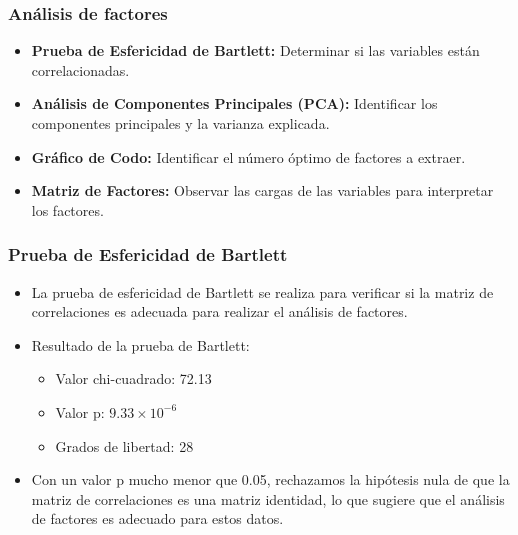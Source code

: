 \documentclass[
	11pt, %
]{beamer}
\begin{document}

\begin{frame}
  \frametitle{Análisis de factores}

    \begin{itemize}
    \item \textbf{Prueba de Esfericidad de Bartlett:} Determinar si las variables están correlacionadas.
    \item \textbf{Análisis de Componentes Principales (PCA):} Identificar los componentes principales y la varianza explicada.
    \item \textbf{Gráfico de Codo:} Identificar el número óptimo de factores a extraer.
    \item \textbf{Matriz de Factores:} Observar las cargas de las variables para interpretar los factores.
  \end{itemize}
 
\end{frame}


\begin{frame}
\frametitle{Prueba de Esfericidad de Bartlett}

\begin{itemize}
    \item La prueba de esfericidad de Bartlett se realiza para verificar si la matriz de correlaciones es adecuada para realizar el análisis de factores.
    \item Resultado de la prueba de Bartlett:
    \begin{itemize}
        \item Valor chi-cuadrado: 72.13
        \item Valor p: \( 9.33 \times 10^{-6} \)
        \item Grados de libertad: 28
    \end{itemize}
    \item Con un valor p mucho menor que 0.05, rechazamos la hipótesis nula de que la matriz de correlaciones es una matriz identidad, lo que sugiere que el análisis de factores es adecuado para estos datos.
\end{itemize}

\end{frame}
\end{document}
